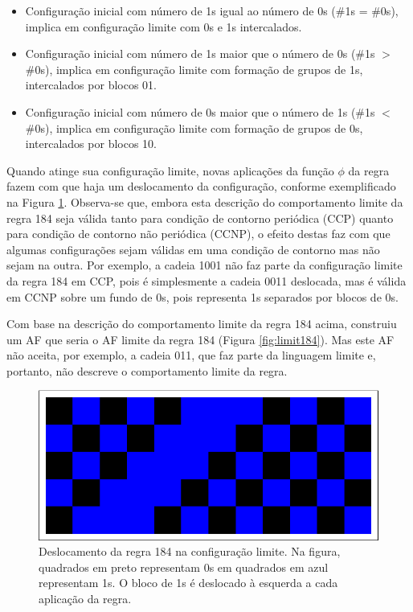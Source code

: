 \documentclass[12pt,a4paper]{article}
\begin{document}
\begin{itemize}
\item Configuração inicial com número de 1s igual ao número de 0s
(\#1s = \#0s), implica em configuração limite com 0s e 1s
intercalados.

\item Configuração inicial com número de 1s maior que o número de 0s
(\#1s $>$ \#0s), implica em configuração limite com formação de grupos de
1s, intercalados por blocos 01.

\item Configuração inicial com número de 0s maior que o número de 1s
(\#1s $<$ \#0s), implica em configuração limite com formação de grupos
de 0s, intercalados por blocos 10.
\end{itemize}

Quando atinge sua configuração limite, novas aplicações da função
$\phi$ da regra fazem com que haja um deslocamento da configuração,
conforme exemplificado na Figura \ref{fig:shift}.
Observa-se que, embora esta descrição do comportamento limite da regra
184 seja válida tanto para condição de contorno periódica (CCP) quanto
para condição de contorno não periódica (CCNP), o efeito destas faz
com que algumas configurações sejam válidas em uma condição de contorno
mas não sejam na outra. Por exemplo, a cadeia 1001 não faz parte
da configuração limite da regra 184 em CCP, pois é simplesmente a
cadeia 0011 deslocada, mas é válida em CCNP sobre um fundo de 0s, pois
representa 1s separados por blocos de 0s.

Com base na descrição do comportamento limite da regra 184 acima,
 construiu um AF que seria
o AF limite da regra 184 (Figura \ref{fig:limit184}). Mas este AF não
aceita, por exemplo, a cadeia 011, que faz parte da linguagem limite e,
portanto, não descreve o comportamento limite da regra.

\begin{figure}[htp]
\begin{center}
\includegraphics[scale=1.0]{img/shift.eps}
\caption{Deslocamento da regra 184 na configuração limite. Na figura,
quadrados em preto representam 0s em quadrados em azul representam 1s.
O bloco de 1s é deslocado à esquerda a cada aplicação da regra.}
\label{fig:shift}
\end{center}
\end{figure}
\end{document}

